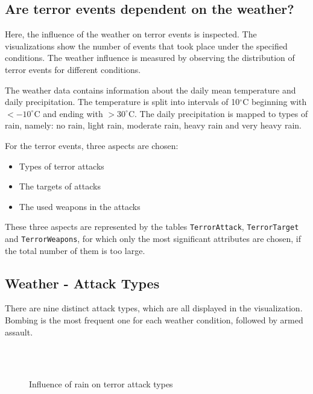 \subsection{Are terror events dependent on the weather?}
Here, the influence of the weather on terror events is inspected. The visualizations show the number of events that took place under the specified conditions. The weather influence is measured by observing the distribution of terror events for different conditions.

The weather data contains information about the daily mean temperature and daily precipitation. The temperature is split into intervals of 10$^\circ$C beginning with $< -10^\circ$C and ending with $> 30^\circ$C. The daily precipitation is mapped to types of rain, namely: no rain, light rain, moderate rain, heavy rain and very heavy rain.

For the terror events, three aspects are chosen:
\begin{itemize}
	\item Types of terror attacks
	\item The targets of attacks
	\item The used weapons in the attacks
\end{itemize}

These three aspects are represented by the tables \texttt{TerrorAttack}, \texttt{TerrorTarget} and \texttt{TerrorWeapons}, for which only the most significant attributes are chosen, if the total number of them is too large.

\newpage

\subsection{Weather - Attack Types}
There are nine distinct attack types, which are all displayed in the visualization. Bombing is the most frequent one for each weather condition, followed by armed assault.

\begin{figure}[!hbt]
\centering
    \qquad\\
    \qquad
    \qquad\\
    \qquad
\caption{Influence of rain on terror attack types}
\end{figure}

